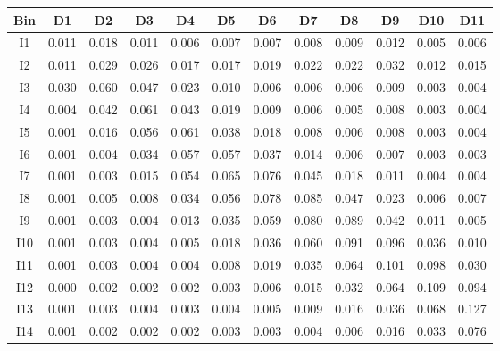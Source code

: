 \begin{tabular}{c@{~~~}c@{~~}c@{~~}c@{~~}c@{~~}c@{~~}c@{~~}c@{~~}c@{~~}c@{~~}c@{~~}c}
\hline
 \hline
Bin	& D1 & D2 & D3 & D4 & D5 & D6 & D7 & D8 & D9 & D10 & D11 \\
\hline
I1	&  0.011 &  0.018 &  0.011 &  0.006 &  0.007 &  0.007 &  0.008 &  0.009 &  0.012 &  0.005 &  0.006 \\
I2	&  0.011 &  0.029 &  0.026 &  0.017 &  0.017 &  0.019 &  0.022 &  0.022 &  0.032 &  0.012 &  0.015 \\
I3	&  0.030 &  0.060 &  0.047 &  0.023 &  0.010 &  0.006 &  0.006 &  0.006 &  0.009 &  0.003 &  0.004 \\
I4	&  0.004 &  0.042 &  0.061 &  0.043 &  0.019 &  0.009 &  0.006 &  0.005 &  0.008 &  0.003 &  0.004 \\
I5	&  0.001 &  0.016 &  0.056 &  0.061 &  0.038 &  0.018 &  0.008 &  0.006 &  0.008 &  0.003 &  0.004 \\
I6	&  0.001 &  0.004 &  0.034 &  0.057 &  0.057 &  0.037 &  0.014 &  0.006 &  0.007 &  0.003 &  0.003 \\
I7	&  0.001 &  0.003 &  0.015 &  0.054 &  0.065 &  0.076 &  0.045 &  0.018 &  0.011 &  0.004 &  0.004 \\
I8	&  0.001 &  0.005 &  0.008 &  0.034 &  0.056 &  0.078 &  0.085 &  0.047 &  0.023 &  0.006 &  0.007 \\
I9	&  0.001 &  0.003 &  0.004 &  0.013 &  0.035 &  0.059 &  0.080 &  0.089 &  0.042 &  0.011 &  0.005 \\
I10	&  0.001 &  0.003 &  0.004 &  0.005 &  0.018 &  0.036 &  0.060 &  0.091 &  0.096 &  0.036 &  0.010 \\
I11	&  0.001 &  0.003 &  0.004 &  0.004 &  0.008 &  0.019 &  0.035 &  0.064 &  0.101 &  0.098 &  0.030 \\
I12	&  0.000 &  0.002 &  0.002 &  0.002 &  0.003 &  0.006 &  0.015 &  0.032 &  0.064 &  0.109 &  0.094 \\
I13	&  0.001 &  0.003 &  0.004 &  0.003 &  0.004 &  0.005 &  0.009 &  0.016 &  0.036 &  0.068 &  0.127 \\
I14	&  0.001 &  0.002 &  0.002 &  0.002 &  0.003 &  0.003 &  0.004 &  0.006 &  0.016 &  0.033 &  0.076 \\
\hline
 \hline
\end{tabular}
